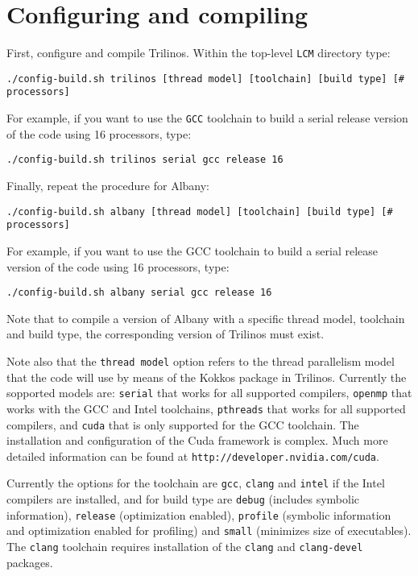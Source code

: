 \documentclass[10pt,a4paper]{article} \usepackage[utf8]{inputenc}
\begin{document}
\section{Configuring and compiling}
First, configure and compile Trilinos. Within the top-level \verb+LCM+
directory type:
\begin{verbatim}
./config-build.sh trilinos [thread model] [toolchain] [build type] [# processors]
\end{verbatim}

For example, if you want to use the \verb+GCC+ toolchain to build a
serial release version of the code using 16 processors, type:
\begin{verbatim}
./config-build.sh trilinos serial gcc release 16
\end{verbatim}

Finally, repeat the procedure for Albany:
\begin{verbatim}
./config-build.sh albany [thread model] [toolchain] [build type] [# processors]
\end{verbatim}

For example, if you want to use the GCC toolchain to build a
serial release version of the code using 16 processors, type:
\begin{verbatim}
./config-build.sh albany serial gcc release 16
\end{verbatim}

Note that to compile a version of Albany with a specific thread model,
toolchain and build type, the corresponding version of Trilinos must
exist.

Note also that the \verb+thread model+ option refers to the thread
parallelism model that the code will use by means of the Kokkos
package in Trilinos. Currently the sopported models are: \verb+serial+
that works for all supported compilers, \verb+openmp+ that works with
the GCC and Intel toolchains, \verb+pthreads+ that works for all
supported compilers, and \verb+cuda+ that is only supported for the
GCC toolchain. The installation and configuration of the Cuda
framework is complex. Much more detailed information can be found at
\verb+http://developer.nvidia.com/cuda+.

Currently the options for the toolchain are \verb+gcc+, \verb+clang+
and \verb+intel+ if the Intel compilers are installed, and for build
type are \verb+debug+ (includes symbolic information), \verb+release+
(optimization enabled), \verb+profile+ (symbolic information and
optimization enabled for profiling) and \verb+small+ (minimizes size
of executables). The \verb+clang+ toolchain requires installation of
the \verb+clang+ and \verb+clang-devel+ packages.
\end{document}
